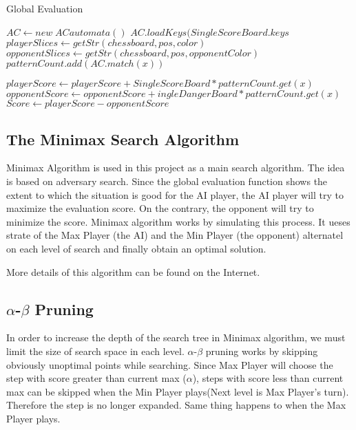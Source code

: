 \documentclass[conference]{IEEEtran}
\begin{document}
\begin{algorithm}
    \caption{Global Evaluation}
\begin{algorithmic}[1]
    \State $AC \gets new\; ACautomata()$
    \State $AC.loadKeys(SingleScoreBoard.keys$
    \State $playerSlices \gets getStr(chessboard, pos, color)$
    \State $opponentSlices \gets getStr(chessboard, pos, opponentColor)$
        \State $patternCount.add(AC.match(x))$
    \EndFor

        \State $playerScore \gets playerScore + SingleScoreBoard*patternCount.get(x)$
        \Else
        \State $opponentScore \gets opponentScore + ingleDangerBoard*patternCount.get(x)$
        \EndIf
    \EndFor
    \State $Score \gets playerScore - opponentScore$
\end{algorithmic}
\end{algorithm}
\subsection{The Minimax Search Algorithm}
Minimax Algorithm is used in this project as a main search algorithm. The idea is based on adversary search. Since the global evaluation function shows the extent to which the situation is good for the AI player, the AI player will try to maximize the evaluation score. On the contrary, the opponent will try to minimize the score. Minimax algorithm works by simulating this process. It ueses strate of the Max Player (the AI) and the Min Player (the opponent) alternatel on each level of search and finally obtain an optimal solution.

More details of this algorithm can be found on the Internet. 

\subsection{$\alpha$-$\beta$ Pruning}
In order to increase the depth of the search tree in Minimax algorithm, we must limit the size of search space in each level. $\alpha$-$\beta$ pruning works by skipping obviously unoptimal points while searching. Since Max Player will choose the step with score greater than current max ($\alpha$), steps with score less than current max can be skipped when the Min Player plays(Next level is Max Player's turn). Therefore the step is no longer expanded. Same thing happens to when the Max Player plays.
\end{document}
